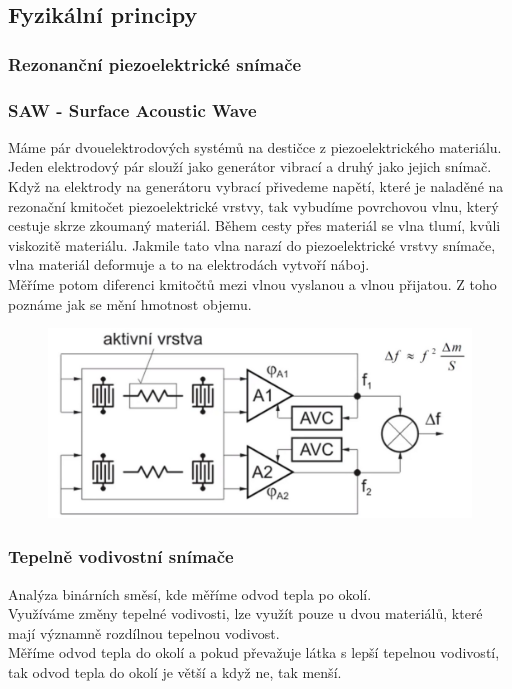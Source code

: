\subsection{Fyzikální principy}
\subsubsection{Rezonanční piezoelektrické snímače}
\subsubsection*{SAW - Surface Acoustic Wave}
Máme pár dvouelektrodových systémů na destičce z piezoelektrického materiálu. Jeden elektrodový pár slouží jako generátor vibrací a druhý jako jejich snímač.\\
Když na elektrody na generátoru vybrací přivedeme napětí, které je naladěné na rezonační kmitočet piezoelektrické vrstvy, tak vybudíme povrchovou vlnu, který cestuje skrze zkoumaný materiál. Během cesty přes materiál se vlna tlumí, kvůli viskozitě materiálu. Jakmile tato vlna narazí do piezoelektrické vrstvy snímače, vlna materiál deformuje a to na elektrodách vytvoří náboj.\\
Měříme potom diferenci kmitočtů mezi vlnou vyslanou a vlnou přijatou. Z toho poznáme jak se mění hmotnost objemu.\\
\begin{figure}[h!]
    \centering
    \includegraphics[scale = 0.1]{img/ChemPiezoEl.png}
\end{figure}

\subsubsection{Tepelně vodivostní snímače}
Analýza binárních směsí, kde měříme odvod tepla po okolí.\\
Využíváme změny tepelné vodivosti, lze využít pouze u dvou materiálů, které mají významně rozdílnou tepelnou vodivost.\\
Měříme odvod tepla do okolí a pokud převažuje látka s lepší tepelnou vodivostí, tak odvod tepla do okolí je větší a když ne, tak menší.\\

